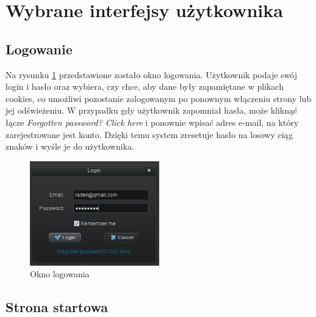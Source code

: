
\clearpage
\section{Wybrane interfejsy użytkownika}
\label{sec:interfejsy}

\subsection{Logowanie}
\label{sec:login}
Na rysunku \ref{fig:login} przedstawione zostało okno logowania. Użytkownik podaje swój login i hasło oraz wybiera, czy chce, aby dane były zapamiętane w plikach cookies, co umożliwi pozostanie zalogowanym po ponownym włączeniu strony lub jej odświeżeniu. W przypadku gdy użytkownik zapomniał hasła, może kliknąć łącze \emph{Forgotten password? Click here} i ponownie wpisać adres e-mail, na który zarejestrowane jest konto. Dzięki temu system zresetuje hasło na losowy ciąg znaków i wyśle je do użytkownika.

\begin{figure}[h!]	
\centering
\includegraphics[width=0.5\textwidth]{./img/interfejsy/login2}
\caption{Okno logowania}
\label{fig:login}
\end{figure}

\subsection{Strona startowa}
\label{sec:start_page}

